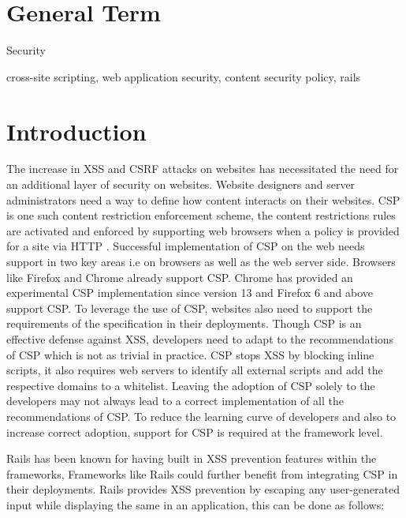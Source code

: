 \documentclass[10pt, conference, compsocconf]{IEEEtran}
\begin{document}
\section{General Term} %
\label{sec:general_term}
Security \\

\begin{IEEEkeywords}
cross-site scripting, web application security, content security policy, rails
\end{IEEEkeywords}

\IEEEpeerreviewmaketitle

\section{Introduction}
The increase in XSS and CSRF attacks on websites has necessitated the need for an additional layer of security on websites. Website designers and server administrators need a way to define how content interacts on their websites. CSP is one such content restriction enforcement scheme, the content restrictions rules are activated and enforced by supporting web browsers when a policy is provided for a site via HTTP \cite{IEEEhowto:stamm} . Successful implementation of CSP on the web needs support in two key areas i.e on browsers as well as the web server side. Browsers like Firefox and Chrome already support CSP. Chrome has provided an experimental CSP implementation since version 13 and Firefox 6 and above support CSP. To leverage the use of CSP, websites also need to support the requirements of the specification in their deployments. Though CSP is an effective defense against XSS, developers need to adapt to the recommendations of CSP which is not as trivial in practice. CSP stops XSS by blocking inline scripts, it also requires web servers to identify all external scripts and add the respective domains to a whitelist. Leaving the adoption of CSP solely to the developers may not always lead to a correct implementation of all the recommendations of CSP. To reduce the learning curve of developers and also to increase correct adoption, support for CSP is required at the framework level.

Rails has been known for having built in XSS prevention features within the frameworks, Frameworks like Rails could further benefit from integrating CSP in their deployments. Rails provides XSS prevention by escaping any user-generated input while displaying the same  in an application,  this can be done as follows:
\end{document}
